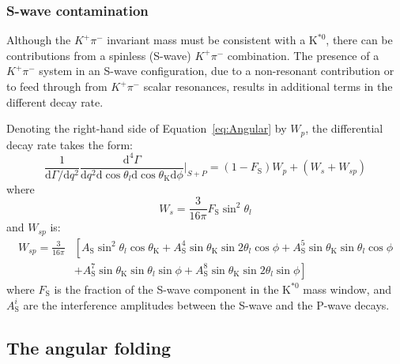 \subsubsection{S-wave contamination}
\label{sec:S-waveform}

Although the $K^+\pi^-$ invariant mass must be consistent with a $\text{K}^{*0}$, there can be contributions from a spinless (S-wave) $K^+\pi^-$ combination.
The presence of a $K^+\pi^-$ system in an S-wave configuration, due to a non-resonant contribution or to feed through from $K^+\pi^-$ scalar resonances, results in additional terms in the different decay rate.

Denoting the right-hand side of Equation~\ref{eq:Angular} by $W_p$, the differential decay rate takes the form:
\begin{equation} \label{eq:S-wave}
  \frac{1}{\mathrm{d}\Gamma/\mathrm{d}q^2}\frac{\mathrm{d}^4\Gamma}{\mathrm{d}q^2 \mathrm{d}\cos\theta_l \mathrm{d}\cos\theta_\mathrm{K} \mathrm{d}\phi}\bigg|_{S+P} = (1-F_\mathrm{S})W_p + (W_s + W_{sp})
\end{equation}
where 
\begin{equation} \label{eq:S-wave0}
  W_s = \frac{3}{16\pi} F_\mathrm{S}\sin^2\theta_l
\end{equation}
and $W_{sp}$ is:
\begin{equation} \label{eq:S-wave1}
  \begin{split}
    W_{sp}=\frac{3}{16 \pi}&\left[A_\mathrm{S}\sin^2\theta_l\cos\theta_\mathrm{K}+ A_\mathrm{S}^4\sin\theta_\mathrm{K}\sin2\theta_l\cos\phi+A^5_\mathrm{S}\sin\theta_\mathrm{K}\sin\theta_l\cos\phi\right.\\
      &+\left.A_\mathrm{S}^7\sin\theta_\mathrm{K}\sin\theta_l\sin\phi+A_\mathrm{S}^8\sin\theta_\mathrm{K}\sin2\theta_l\sin\phi\right]
  \end{split}
\end{equation}
where $F_\mathrm{S}$ is the fraction of the S-wave component in the $\text{K}^{*0}$ mass window, and $A_\mathrm{S}^i$ are the interference amplitudes between the S-wave and the P-wave decays\cite{Genon:Swave}.

\subsection{The angular folding}
\label{sec:folding}


